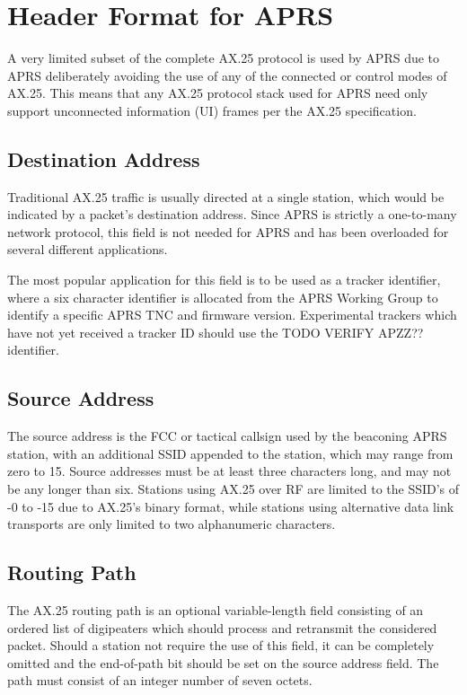 \section{Header Format for APRS}

A very limited subset of the complete AX.25 protocol is used by APRS due to APRS 
deliberately avoiding the use of any of the connected or control modes of AX.25. This 
means that any AX.25 protocol stack used for APRS need only support unconnected information (UI)
frames per the AX.25 specification.

\subsection{Destination Address}

Traditional AX.25 traffic is usually directed at a single station, which would be indicated by 
a packet's destination address. Since APRS is strictly a one-to-many network protocol, this field
is not needed for APRS and has been overloaded for several different applications.

The most popular application for this field is to be used as a tracker identifier, where a
six character identifier is allocated from the APRS Working Group to identify a specific 
APRS TNC and firmware version. Experimental trackers which have not yet received a tracker ID
should use the TODO VERIFY APZZ?? identifier.

\subsection{Source Address}

The source address is the FCC or tactical callsign used by the beaconing APRS station, with an 
additional SSID appended to the station, which may range from zero to 15. Source addresses must 
be at least three characters long, and may not be any longer than six. Stations using AX.25 
over RF are limited to the SSID's of -0 to -15 due to AX.25's binary format, 
while stations using alternative data link transports are only limited to 
two alphanumeric characters.

\subsection{Routing Path}
\label{subsec:ax25RoutingPath}

The AX.25 routing path is an optional variable-length field consisting of an ordered list of
digipeaters which should process and retransmit the considered packet. Should a station not
require the use of this field, it can be completely omitted and the end-of-path bit should be
set on the source address field. The path must consist of an integer number of seven octets.

